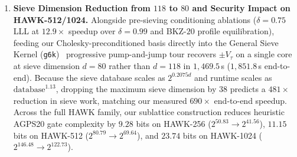 \documentclass[11pt,a4paper]{article}
\theoremstyle{definition}
\newcommand{\Vt}{V_\tau}
\begin{document}
\begin{enumerate}[leftmargin=*]
\item \textbf{Sieve Dimension Reduction from $118$ to $80$ and Security Impact on HAWK-512/1024.}
Alongside pre-sieving conditioning ablations ($\delta=0.75$ LLL at $12.9\times$ speedup over $\delta=0.99$ and BKZ-$20$ profile equilibration), feeding our Cholesky-preconditioned basis directly into the General Sieve Kernel (\texttt{g6k})~\cite{ADH+19} progressive pump-and-jump tour recovers $\pm\Vt$ on a single core at sieve dimension $d=80$ rather than $d=118$ in $1{,}469.5$\,s ($1{,}851.8$\,s end-to-end). Because the sieve database scales as $2^{0.2075d}$ and runtime scales as $\text{database}^{1.13}$, dropping the maximum sieve dimension by $38$ predicts a $481\times$ reduction in sieve work, matching our measured $690\times$ end-to-end speedup. Across the full HAWK family, our sublattice construction reduces heuristic AGPS20 gate complexity by $9.28$ bits on HAWK-256 ($2^{50.83}\to 2^{41.56}$), $11.15$ bits on HAWK-512 ($2^{80.79}\to 2^{69.64}$), and $23.74$ bits on HAWK-1024 ($2^{146.48}\to 2^{122.73}$).
\end{enumerate}
\end{document}
